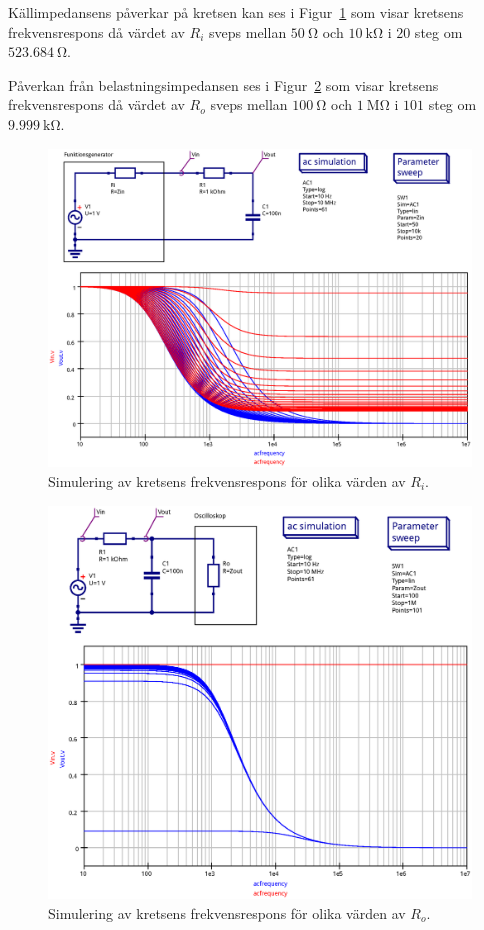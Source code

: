 Källimpedansens påverkar på kretsen kan ses i Figur~\ref{fig:Zin-step} som
visar kretsens frekvensrespons då värdet av $R_i$ sveps mellan $\SI{50}{\ohm}$
och $\SI{10}{\kohm}$ i $20$ steg om $\SI{523.684}{\ohm}$.

Påverkan från belastningsimpedansen ses i Figur~\ref{fig:Zout-step} som visar
kretsens frekvensrespons då värdet av $R_o$ sveps mellan $\SI{100}{\ohm}$ och
$\SI{1}{\mega\ohm}$ i $101$ steg om $\SI{9.999}{\kohm}$.


\begin{figure}[ht]\label{fig:Zin-step}
  \centering
  \includegraphics[width=\linewidth]{sim/ee466_lab-4_prj/uppgift-3_Zin_step}
  \caption[] {Simulering av kretsens frekvensrespons för olika värden av $R_i$.}
\end{figure}

\begin{figure}[ht]\label{fig:Zout-step}
  \centering
  \includegraphics[width=\linewidth]{sim/ee466_lab-4_prj/uppgift-3_Zout_step}
  \caption[] {Simulering av kretsens frekvensrespons för olika värden av $R_o$.}
\end{figure}


